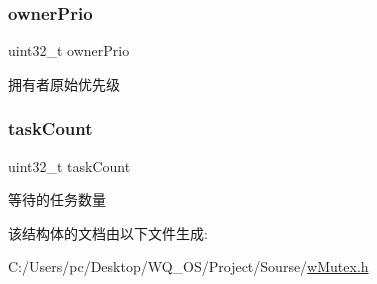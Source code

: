 \subsubsection{\texorpdfstring{owner\+Prio}{ownerPrio}}
{\footnotesize\ttfamily uint32\+\_\+t owner\+Prio}

拥有者原始优先级 \mbox{\label{struct__w_mutex_info_a80462c64b9184115aa568f08227f7f4a}} 
\subsubsection{\texorpdfstring{task\+Count}{taskCount}}
{\footnotesize\ttfamily uint32\+\_\+t task\+Count}

等待的任务数量 

该结构体的文档由以下文件生成\+:\begin{DoxyCompactItemize}
\item 
C\+:/\+Users/pc/\+Desktop/\+W\+Q\+\_\+\+O\+S/\+Project/\+Sourse/\mbox{\hyperlink{w_mutex_8h}{w\+Mutex.\+h}}\end{DoxyCompactItemize}
